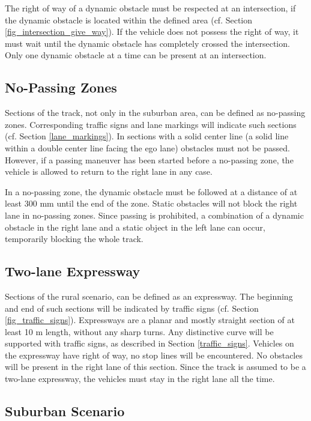 \documentclass[a4paper]{report}
\begin{document}
{{The right of way of a dynamic obstacle must be respected at an intersection, if the dynamic obstacle is located within the defined area (cf. Section \ref{fig_intersection_give_way}). If the vehicle does not possess the right of way, it must wait until the dynamic obstacle has completely crossed the intersection. Only one dynamic obstacle at a time can be present at an intersection. 


\subsection{No-Passing Zones}
\label{no_passing_zones}

Sections of the track, not only in the suburban area, can be defined as no-passing zones. Corresponding traffic signs and lane markings will indicate such sections (cf. Section \ref{lane_markings}). In sections with a solid center line (a solid line within a double center line facing the ego lane) obstacles must not be passed. However, if a passing maneuver has been started before a no-passing zone, the vehicle is allowed to return to the right lane in any case. 

In a no-passing zone, the dynamic obstacle must be followed at a distance of at least 300 mm until the end of the zone. Static obstacles will not block the right lane in no-passing zones. Since passing is prohibited, a combination of a dynamic obstacle in the right lane and a static object in the left lane can occur, temporarily blocking the whole track. 

\subsection{Two-lane Expressway}

Sections of the rural scenario, can be defined as an expressway. The beginning and end of such sections will be indicated by traffic signs (cf. Section \ref{fig_traffic_signs}). Expressways are a planar and mostly straight section of at least 10 m length, without any sharp turns. Any distinctive curve will be supported with traffic signs, as described in Section \ref{traffic_signs}. Vehicles on the expressway have right of way, no stop lines will be encountered. No obstacles will be present in the right lane of this section. Since the track is assumed to be a two-lane expressway, the vehicles must stay in the right lane all the time.  

\subsection{Suburban Scenario}

}}
\end{document}
